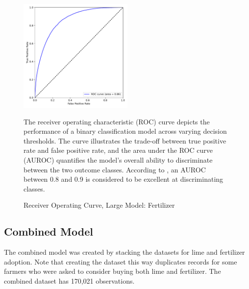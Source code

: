 \documentclass[12pt]{article}
\begin{document}
\begin{figure}[H]
    \centering
    \caption{Receiver Operating Curve, Large Model: Fertilizer}
    \includegraphics[width=0.5\textwidth]{../output/lightgbm_roc_fert.pdf}
    \begin{minipage}{0.6\textwidth}
    \tiny
    The receiver operating characteristic (ROC) curve depicts the performance of a binary classification model across varying decision thresholds. The curve illustrates the trade-off between true positive rate and false positive rate, and the area under the ROC curve (AUROC) quantifies the model's overall ability to discriminate between the two outcome classes. According to \textcite{mandrekar_receiver_2010}, an AUROC between 0.8 and 0.9 is considered to be excellent at discriminating classes.
    \end{minipage}
    \label{fig:roc_fert}
\end{figure}

\subsection{Combined Model}
\label{sec:combined_model}
The combined model was created by stacking the datasets for lime and fertilizer adoption. Note that creating the dataset this way duplicates records for some farmers who were asked to consider buying both lime and fertilizer. The combined dataset has 170,021 observations.
\end{document}

